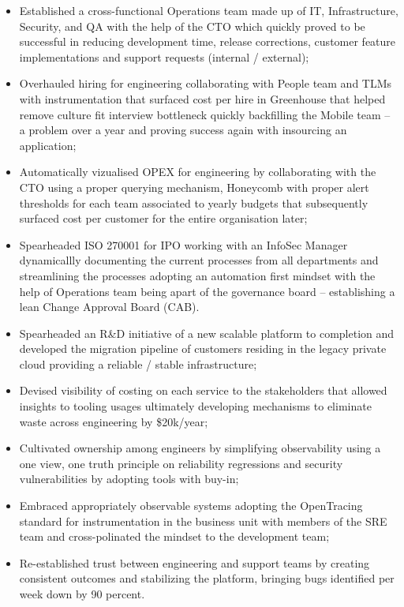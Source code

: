 \documentclass[11pt,a4paper,nolmodern,colorlinks=true,linkcolor=true]{moderncv}
\begin{document}
%
  {
    \begin{itemize}
      \item Established a cross-functional Operations team made up of IT, Infrastructure, Security, and QA with the help of the CTO which quickly proved to be successful in reducing development time, release corrections, customer feature implementations and support requests (internal / external);
      \item Overhauled hiring for engineering collaborating with People team and TLMs with instrumentation that surfaced cost per hire in Greenhouse that helped remove culture fit interview bottleneck quickly backfilling the Mobile team -- a problem over a year and proving success again with insourcing an application;
      \item Automatically vizualised OPEX for engineering by collaborating with the CTO using a proper querying mechanism, Honeycomb with proper alert thresholds for each team associated to yearly budgets that subsequently surfaced cost per customer for the entire organisation later;
      \item Spearheaded ISO 270001 for IPO working with an InfoSec Manager dynamicallly documenting the current processes from all departments and streamlining the processes adopting an automation first mindset with the help of Operations team being apart of the governance board -- establishing a lean Change Approval Board (CAB).
    \end{itemize}
}

%
  {
    \begin{itemize}
      \item Spearheaded an R\&D initiative of a new scalable platform to completion and developed the migration pipeline of customers residing in the legacy private cloud providing a reliable / stable infrastructure;
      \item Devised visibility of costing on each service to the stakeholders that allowed insights to tooling usages ultimately developing mechanisms to eliminate waste across engineering by \$20k/year;
      \item Cultivated ownership among engineers by simplifying observability using a one view, one truth principle on reliability regressions and security vulnerabilities by adopting tools with buy-in;
      \item Embraced appropriately observable systems adopting the OpenTracing standard for instrumentation in the business unit with members of the SRE team and cross-polinated the mindset to the development team;
      \item Re-established trust between engineering and support teams by creating consistent outcomes and stabilizing the platform, bringing bugs identified per week down by 90 percent.
    \end{itemize}
}
\end{document}
